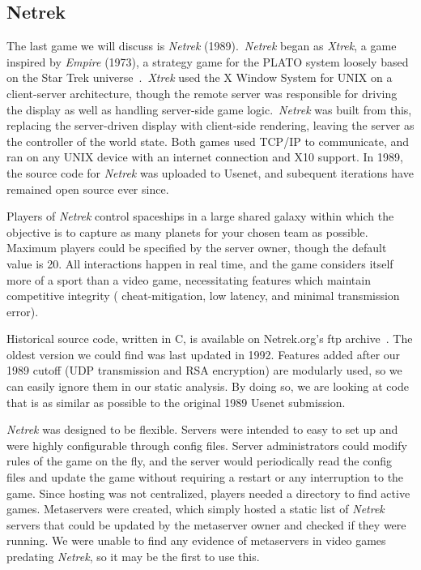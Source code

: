 \subsection{Netrek}\label{subsec:netrek}

The last game we will discuss is \textit{Netrek} (1989).\ \textit{Netrek} began as \textit{Xtrek}, a game inspired by \textit{Empire} (1973), a strategy game for the PLATO system loosely based on the Star Trek universe~\cite{netrekhist}.\ \textit{Xtrek} used the X Window System for UNIX on a client-server architecture, though the remote server was responsible for driving the display as well as handling server-side game logic.\ \textit{Netrek} was built from this, replacing the server-driven display with client-side rendering, leaving the server as the controller of the world state. Both games used TCP/IP to communicate, and ran on any UNIX device with an internet connection and X10 support. In 1989, the source code for \textit{Netrek} was uploaded to Usenet, and subequent iterations have remained open source ever since.

Players of \textit{Netrek} control spaceships in a large shared galaxy within which the objective is to capture as many planets for your chosen team as possible. Maximum players could be specified by the server owner, though the default value is 20. All interactions happen in real time, and the game considers itself more of a sport than a video game, necessitating features which maintain competitive integrity (\eg{} cheat-mitigation, low latency, and minimal transmission error).

Historical source code, written in C, is available on Netrek.org's ftp archive~\cite{netreksrc}. The oldest version we could find was last updated in 1992. Features added after our 1989 cutoff (UDP transmission and RSA encryption) are modularly used, so we can easily ignore them in our static analysis. By doing so, we are looking at code that is as similar as possible to the original 1989 Usenet submission.

\textit{Netrek} was designed to be flexible. Servers were intended to easy to set up and were highly configurable through config files. Server administrators could modify rules of the game on the fly, and the server would periodically read the config files and update the game without requiring a restart or any interruption to the game. Since hosting was not centralized, players needed a directory to find active games. Metaservers were created, which simply hosted a static list of \textit{Netrek} servers that could be updated by the metaserver owner and checked if they were running. We were unable to find any evidence of metaservers in video games predating \textit{Netrek}, so it may be the first to use this.

